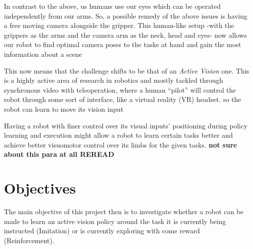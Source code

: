   In contrast to the above, us humans use our eyes which can be operated independently from our arms. So, a possible remedy of the above issues is having a free moving camera alongside the gripper. This human-like setup -with the grippers as the arms and the camera arm as the neck, head and eyes- now allows our robot to find optimal camera poses to the tasks at hand and gain the most information about a scene
  


  This now means that the challenge shifts to be that of an \emph{Active Vision} one. This is a highly active area of research in robotics and mostly tackled through synchronous video with teleoperation\cite{exploringActiveVision2024chuang,?}, where a human ``pilot'' will control the robot through some sort of interface, like a virtual reality (VR) headset. so the robot can learn to move its vision input 

  Having a robot with finer control over its visual inputs' positioning during policy learning and execution might allow a robot to learn certain tasks better and achieve better visuomotor control over its limbs for the given tasks. \textbf{not sure about this para at all REREAD} 

        
\section{Objectives}
    The main objective of this project then is to investigate whether a robot can be made to learn an active vision policy around the task it is currently being instructed (Imitation) or is currently exploring with come reward (Reinforcement).

